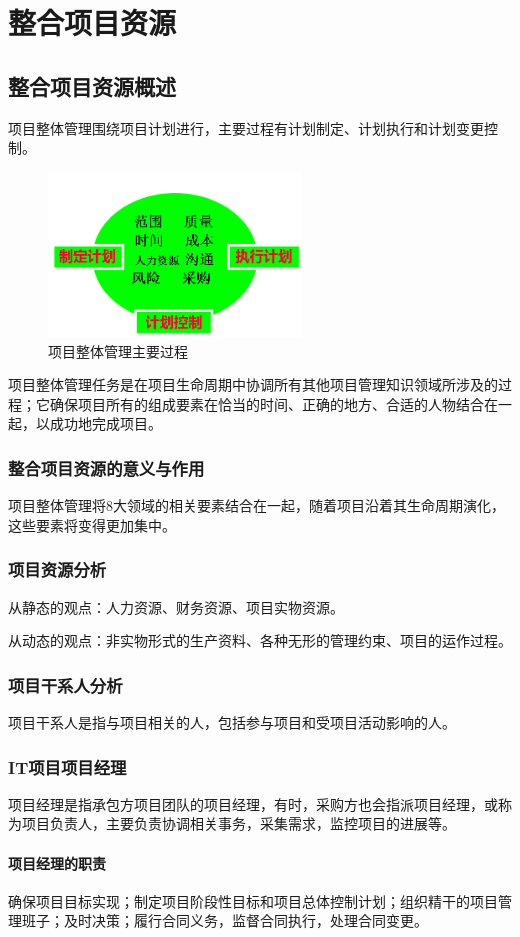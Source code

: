 \chapter{整合项目资源}
\section{整合项目资源概述}
项目整体管理围绕项目计划进行，主要过程有计划制定、计划执行和计划变更控制。
\begin{figure}[!h]
	\centering
	\includegraphics[width=0.6\textwidth]{image/3-1}
	\caption{项目整体管理主要过程}
\end{figure}
项目整体管理任务是在项目生命周期中协调所有其他项目管理知识领域所涉及的过程；它确保项目所有的组成要素在恰当的时间、正确的地方、合适的人物结合在一起，以成功地完成项目。
\subsection{整合项目资源的意义与作用}
项目整体管理将8大领域的相关要素结合在一起，随着项目沿着其生命周期演化，这些要素将变得更加集中。
\subsection{项目资源分析}
从静态的观点：人力资源、财务资源、项目实物资源。
\par 从动态的观点：非实物形式的生产资料、各种无形的管理约束、项目的运作过程。
\subsection{项目干系人分析}
项目干系人是指与项目相关的人，包括参与项目和受项目活动影响的人。
\subsection{IT项目项目经理}
项目经理是指承包方项目团队的项目经理，有时，采购方也会指派项目经理，或称为项目负责人，主要负责协调相关事务，采集需求，监控项目的进展等。
\subsubsection*{项目经理的职责}
确保项目目标实现；制定项目阶段性目标和项目总体控制计划；组织精干的项目管理班子；及时决策；履行合同义务，监督合同执行，处理合同变更。 
